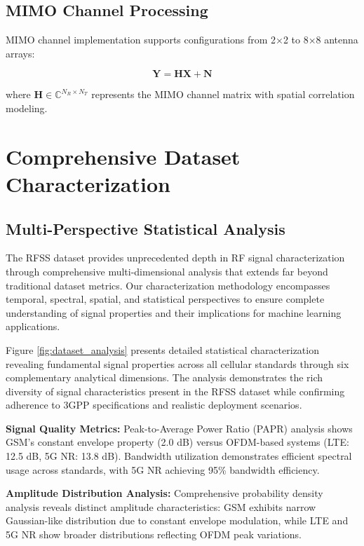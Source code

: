 \documentclass[twocolumn]{article}
\begin{document}
\subsection{MIMO Channel Processing}

MIMO channel implementation supports configurations from 2×2 to 8×8 antenna arrays:

\begin{equation}
\mathbf{Y} = \mathbf{H} \mathbf{X} + \mathbf{N}
\end{equation}

where $\mathbf{H} \in \mathbb{C}^{N_R \times N_T}$ represents the MIMO channel matrix with spatial correlation modeling.

\section{Comprehensive Dataset Characterization}

\subsection{Multi-Perspective Statistical Analysis}

The RFSS dataset provides unprecedented depth in RF signal characterization through comprehensive multi-dimensional analysis that extends far beyond traditional dataset metrics. Our characterization methodology encompasses temporal, spectral, spatial, and statistical perspectives to ensure complete understanding of signal properties and their implications for machine learning applications.

Figure \ref{fig:dataset_analysis} presents detailed statistical characterization revealing fundamental signal properties across all cellular standards through six complementary analytical dimensions. The analysis demonstrates the rich diversity of signal characteristics present in the RFSS dataset while confirming adherence to 3GPP specifications and realistic deployment scenarios.

\textbf{Signal Quality Metrics:} Peak-to-Average Power Ratio (PAPR) analysis shows GSM's constant envelope property (2.0 dB) versus OFDM-based systems (LTE: 12.5 dB, 5G NR: 13.8 dB). Bandwidth utilization demonstrates efficient spectral usage across standards, with 5G NR achieving 95\% bandwidth efficiency.

\textbf{Amplitude Distribution Analysis:} Comprehensive probability density analysis reveals distinct amplitude characteristics: GSM exhibits narrow Gaussian-like distribution due to constant envelope modulation, while LTE and 5G NR show broader distributions reflecting OFDM peak variations.
\end{document}

